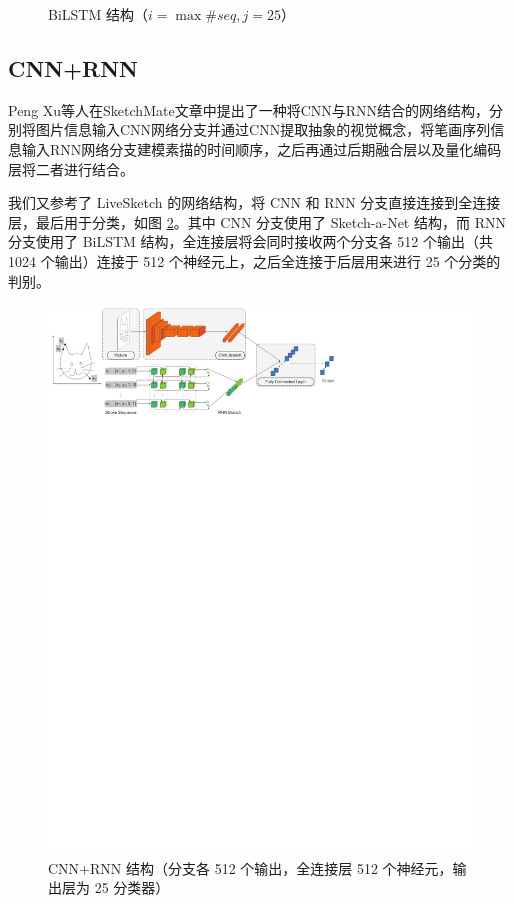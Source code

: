 \begin{figure}[ht]
    \centering
    
    \caption{BiLSTM 结构（$i=\max{\#seq},j=25$）}
    \label{fig:bilstm}
\end{figure}

\subsection{CNN+RNN}
Peng Xu等人在SketchMate\cite{sketchmate}文章中提出了一种将CNN与RNN结合的网络结构，分别将图片信息输入CNN网络分支并通过CNN提取抽象的视觉概念，将笔画序列信息输入RNN网络分支建模素描的时间顺序，之后再通过后期融合层以及量化编码层将二者进行结合。

我们又参考了 LiveSketch\cite{livesketch} 的网络结构，将 CNN 和 RNN 分支直接连接到全连接层，最后用于分类，如图 \ref{fig:cnnrnn}。其中 CNN 分支使用了 Sketch-a-Net 结构，而 RNN 分支使用了 BiLSTM 结构，全连接层将会同时接收两个分支各 512 个输出（共 1024 个输出）连接于 512 个神经元上，之后全连接于后层用来进行 25 个分类的判别。

\begin{figure}[ht]
    \centering
    \includegraphics{img/cnnrnn.pdf}
    \caption{CNN+RNN 结构（分支各 512 个输出，全连接层 512 个神经元，输出层为 25 分类器）}
    \label{fig:cnnrnn}
\end{figure}


